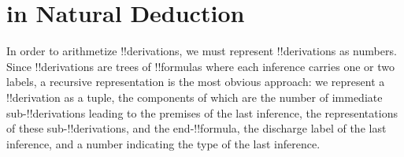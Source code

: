 \documentclass[10pt,a4paper]{article}
\theoremstyle{plain}
\theoremstyle{definition}
\theoremstyle{remark}
\newenvironment{explain}{}{}
\newcommand*{\olfileid}[3]{}
\newcommand*{\olsection}[1]{\section*{#1}}
\begin{document}



\olfileid{inc}{art}{pnd}
\olsection{ in Natural Deduction}

\begin{explain}
In order to arithmetize !!{derivation}s, we must represent
!!{derivation}s as numbers. Since !!{derivation}s are trees of
!!{formula}s where each inference carries one or two labels, a
recursive representation is the most obvious approach: we represent a
!!{derivation} as a tuple, the components of which are the number of
immediate sub-!!{derivation}s leading to the premises of the last
inference, the representations of these sub-!!{derivation}s, and the
end-!!{formula}, the discharge label of the last inference, and a
number indicating the type of the last inference.
\end{explain}
\end{document}
